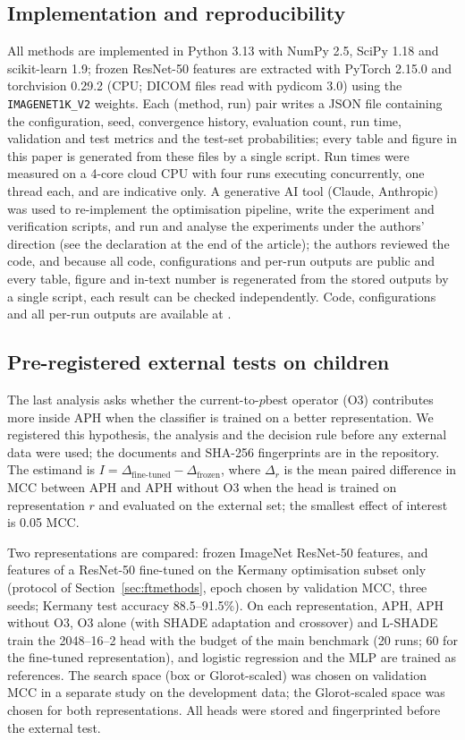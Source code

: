 \documentclass[preprint,12pt]{elsarticle}
\begin{document}
\subsection{Implementation and reproducibility}
All methods are implemented in Python 3.13 with NumPy 2.5, SciPy 1.18 and scikit-learn 1.9; frozen ResNet-50 features are extracted with PyTorch 2.15.0 and torchvision 0.29.2 (CPU; DICOM files read with pydicom 3.0) using the \texttt{IMAGENET1K\_V2} weights. Each (method, run) pair writes a JSON file containing the configuration, seed, convergence history, evaluation count, run time, validation and test metrics and the test-set probabilities; every table and figure in this paper is generated from these files by a single script. Run times were measured on a 4-core cloud CPU with four runs executing concurrently, one thread each, and are indicative only. A generative AI tool (Claude, Anthropic) was used to re-implement the optimisation pipeline, write the experiment and verification scripts, and run and analyse the experiments under the authors' direction (see the declaration at the end of the article); the authors reviewed the code, and because all code, configurations and per-run outputs are public and every table, figure and in-text number is regenerated from the stored outputs by a single script, each result can be checked independently. Code, configurations and all per-run outputs are available at \citet{alsbakhi2026code}.

\subsection{Pre-registered external tests on children}\label{sec:extmethods}
The last analysis asks whether the current-to-$p$best operator (O3) contributes more inside APH when the classifier is trained on a better representation. We registered this hypothesis, the analysis and the decision rule before any external data were used; the documents and SHA-256 fingerprints are in the repository. The estimand is $I=\Delta_{\mathrm{fine\text{-}tuned}}-\Delta_{\mathrm{frozen}}$, where $\Delta_r$ is the mean paired difference in MCC between APH and APH without O3 when the head is trained on representation $r$ and evaluated on the external set; the smallest effect of interest is 0.05 MCC.

Two representations are compared: frozen ImageNet ResNet-50 features, and features of a ResNet-50 fine-tuned on the Kermany optimisation subset only (protocol of Section~\ref{sec:ftmethods}, epoch chosen by validation MCC, three seeds; Kermany test accuracy 88.5--91.5\%). On each representation, APH, APH without O3, O3 alone (with SHADE adaptation and crossover) and L-SHADE train the 2048--16--2 head with the budget of the main benchmark (20 runs; 60 for the fine-tuned representation), and logistic regression and the MLP are trained as references. The search space (box or Glorot-scaled) was chosen on validation MCC in a separate study on the development data; the Glorot-scaled space was chosen for both representations. All heads were stored and fingerprinted before the external test.
\end{document}
